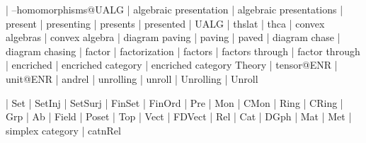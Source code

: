     |   --homomorphisms@UALG
    |   algebraic presentation
    |   algebraic presentations
    |   present
    |   presenting
    |   presents
    |   presented
    |   UALG
    |   thslat
    |   thca
    |   convex algebras
    |   convex algebra
    |   diagram paving
    |   paving
    |   paved
    |   diagram chase
    |   diagram chasing
    |   factor
    |   factorization
    |   factors
    |   factors through
    |   factor through
    |   encriched
    |   encriched category
    |   encriched category Theory
    |   tensor@ENR
    |   unit@ENR
    |   andrel
    |   unrolling
    |   unroll
    |   Unrolling
    |   Unroll


    |   Set
    |   SetInj
    |   SetSurj
    |   FinSet
    |   FinOrd
    |   Pre
    |   Mon
    |   CMon
    |   Ring
    |   CRing
    |   Grp
    |   Ab
    |   Field
    |   Poset
    |   Top
    |   Vect
    |   FDVect
    |   Rel
    |   Cat
    |   DGph
    |   Mat
    |   Met
    |   simplex category
    |   catnRel
